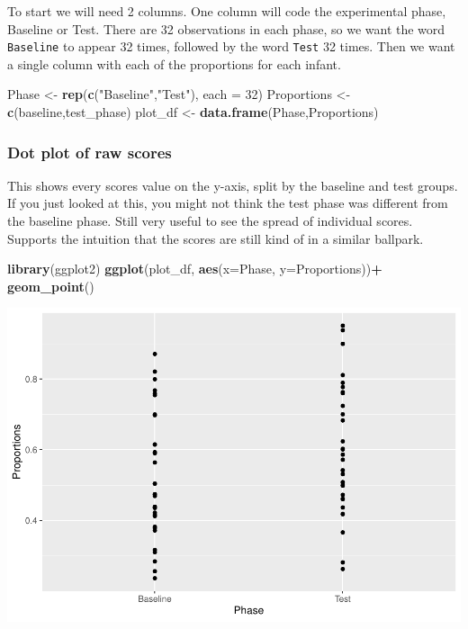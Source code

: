 \documentclass[]{book}
\newenvironment{Shaded}{\begin{snugshade}}{\end{snugshade}}
\newcommand{\KeywordTok}[1]{\textcolor[rgb]{0.13,0.29,0.53}{\textbf{#1}}}
\newcommand{\DataTypeTok}[1]{\textcolor[rgb]{0.13,0.29,0.53}{#1}}
\newcommand{\DecValTok}[1]{\textcolor[rgb]{0.00,0.00,0.81}{#1}}
\newcommand{\StringTok}[1]{\textcolor[rgb]{0.31,0.60,0.02}{#1}}
\newcommand{\OperatorTok}[1]{\textcolor[rgb]{0.81,0.36,0.00}{\textbf{#1}}}
\newcommand{\NormalTok}[1]{#1}
\begin{document}
To start we will need 2 columns. One column will code the experimental
phase, Baseline or Test. There are 32 observations in each phase, so we
want the word \texttt{Baseline} to appear 32 times, followed by the word
\texttt{Test} 32 times. Then we want a single column with each of the
proportions for each infant.

\begin{Shaded}
\begin{Highlighting}[]
\NormalTok{Phase <-}\StringTok{ }\KeywordTok{rep}\NormalTok{(}\KeywordTok{c}\NormalTok{(}\StringTok{"Baseline"}\NormalTok{,}\StringTok{"Test"}\NormalTok{), }\DataTypeTok{each =} \DecValTok{32}\NormalTok{)}
\NormalTok{Proportions <-}\StringTok{ }\KeywordTok{c}\NormalTok{(baseline,test_phase)}
\NormalTok{plot_df <-}\StringTok{ }\KeywordTok{data.frame}\NormalTok{(Phase,Proportions)}
\end{Highlighting}
\end{Shaded}

\subsubsection{Dot plot of raw scores}\label{dot-plot-of-raw-scores}

This shows every scores value on the y-axis, split by the baseline and
test groups. If you just looked at this, you might not think the test
phase was different from the baseline phase. Still very useful to see
the spread of individual scores. Supports the intuition that the scores
are still kind of in a similar ballpark.

\begin{Shaded}
\begin{Highlighting}[]
\KeywordTok{library}\NormalTok{(ggplot2)}
\KeywordTok{ggplot}\NormalTok{(plot_df, }\KeywordTok{aes}\NormalTok{(}\DataTypeTok{x=}\NormalTok{Phase, }\DataTypeTok{y=}\NormalTok{Proportions))}\OperatorTok{+}
\StringTok{  }\KeywordTok{geom_point}\NormalTok{()}
\end{Highlighting}
\end{Shaded}

\includegraphics{Statistics_Lab_files/figure-latex/unnamed-chunk-173-1.pdf}
\end{document}
